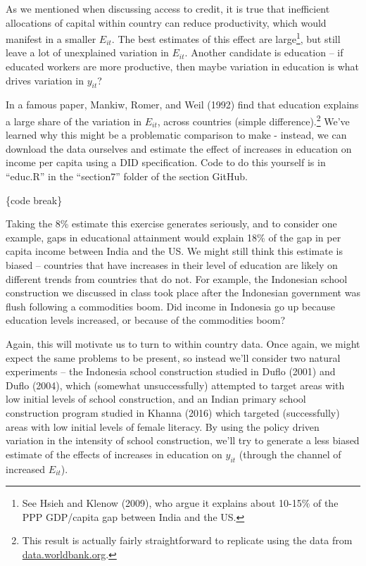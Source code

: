 \documentclass[12pt,english]{article}
\begin{document}
As we mentioned when discussing access to credit, it is true that inefficient allocations of capital within country can reduce productivity, which would manifest in a smaller $E_{it}$. The best estimates of this effect are large\footnote{See Hsieh and Klenow (2009), who argue it explains about 10-15\% of the PPP GDP/capita gap between India and the US.}, but still leave a lot of unexplained variation in $E_{it}$. Another candidate is education -- if educated workers are more productive, then maybe variation in education is what drives variation in $y_{it}$?

In a famous paper, Mankiw, Romer, and Weil (1992) find that education explains a large share of the variation in $E_{it}$, across countries (simple difference).\footnote{This result is actually fairly straightforward to replicate using the data from \href{data.worldbank.org}{data.worldbank.org}.} We've learned why this might be a problematic comparison to make - instead, we can download the data ourselves and estimate the effect of increases in education on income per capita using a DID specification. Code to do this yourself is in ``educ.R'' in the ``section7'' folder of the section GitHub.

\{code break\}

Taking the 8\% estimate this exercise generates seriously, and to consider one example, gaps in educational attainment would explain 18\% of the gap in per capita income between India and the US. We might still think this estimate is biased -- countries that have increases in their level of education are likely on different trends from countries that do not. For example, the Indonesian school construction we discussed in class took place after the Indonesian government was flush following a commodities boom. Did income in Indonesia go up because education levels increased, or because of the commodities boom?

Again, this will motivate us to turn to within country data. Once again, we might expect the same problems to be present, so instead we'll consider two natural experiments -- the Indonesia school construction studied in Duflo (2001) and Duflo (2004), which (somewhat unsuccessfully) attempted to target areas with low initial levels of school construction, and an Indian primary school construction program studied in Khanna (2016) which targeted (successfully) areas with low initial levels of female literacy. By using the policy driven variation in the intensity of school construction, we'll try to generate a less biased estimate of the effects of increases in education on $y_{it}$ (through the channel of increased $E_{it}$).
\end{document}
